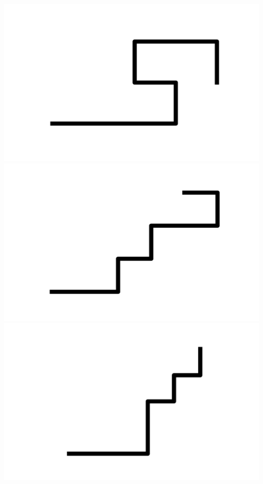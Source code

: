 \documentclass[]{report}
\begin{document}
\includegraphics[scale=.1]{pictures/21/state_cluster_shapes_109.pdf} 
\includegraphics[scale=.1]{pictures/21/state_cluster_shapes_110.pdf} 
\includegraphics[scale=.1]{pictures/21/state_cluster_shapes_111.pdf} 
\end{document}
